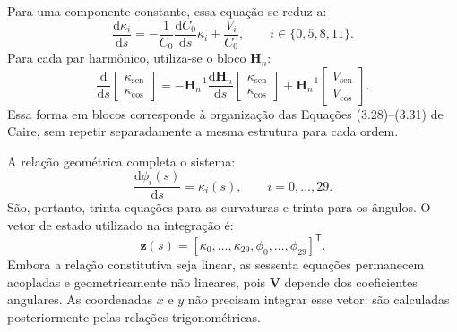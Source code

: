 \documentclass[arial,centeredequations,english,brazilian,oneside,section=TITLE]{ifes8}
\begin{document}
Para uma componente constante, essa equação se reduz a:
\begin{equation}
  \frac{\mathrm{d}\kappa_i}{\mathrm{d}s}
  =-\frac{1}{C_0}\frac{\mathrm{d}C_0}{\mathrm{d}s}\kappa_i
    +\frac{V_i}{C_0},\qquad i\in\{0,5,8,11\}.
  \label{eq:governo-linear-componente-constante}
\end{equation}
Para cada par harmônico, utiliza-se o bloco $\mathbf H_n$:
\begin{equation}
  \frac{\mathrm{d}}{\mathrm{d}s}
  \begin{bmatrix}\kappa_{\mathrm{sen}}\\ \kappa_{\mathrm{cos}}\end{bmatrix}
  =-\mathbf H_n^{-1}\frac{\mathrm{d}\mathbf H_n}{\mathrm{d}s}
    \begin{bmatrix}\kappa_{\mathrm{sen}}\\ \kappa_{\mathrm{cos}}\end{bmatrix}
    +\mathbf H_n^{-1}
    \begin{bmatrix}V_{\mathrm{sen}}\\ V_{\mathrm{cos}}\end{bmatrix}.
  \label{eq:governo-linear-par-harmonico}
\end{equation}
Essa forma em blocos corresponde à organização das Equações (3.28)--(3.31)
de Caire, sem repetir separadamente a mesma estrutura para cada ordem.

A relação geométrica completa o sistema:
\begin{equation}
  \frac{\mathrm{d}\phi_i(s)}{\mathrm{d}s}=\kappa_i(s),
  \qquad i=0,\ldots,29.
  \label{eq:governo-linear-coeficientes-angulo}
\end{equation}
São, portanto, trinta equações para as curvaturas e trinta para os ângulos.
O vetor de estado utilizado na integração é:
\begin{equation}
  \boldsymbol z(s)=
    [\kappa_0,\ldots,\kappa_{29},\phi_0,\ldots,\phi_{29}]^{\mathsf T}.
  \label{eq:estado-sistema-linear}
\end{equation}
Embora a relação constitutiva seja linear, as sessenta equações permanecem
acopladas e geometricamente não lineares, pois $\boldsymbol V$ depende dos
coeficientes angulares. As coordenadas $x$ e $y$ não precisam integrar esse
vetor: são calculadas posteriormente pelas relações trigonométricas.
\end{document}

